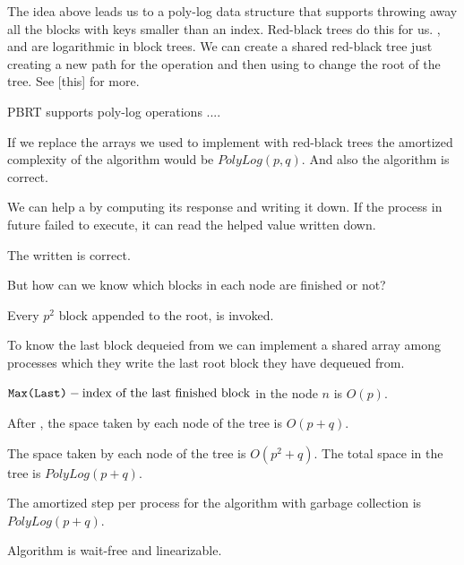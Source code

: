 The idea above leads us to a poly-log data structure that supports throwing away all the blocks with keys smaller than an index. Red-black trees do this for us. ,  and  are logarithmic in block trees.
We can create a shared red-black tree just creating a new path for the operation and then using  to change the root of the tree. See [this] for more.

\begin{observation}
PBRT supports poly-log operations ....
\end{observation}

\begin{lemma}
    If we replace the arrays we used to implement  with red-black trees the amortized complexity of the algorithm would be $PolyLog(p,q)$. And also the algorithm is correct.
\end{lemma}

We can help a  by computing its response and writing it down. If the process in future failed to execute, it can read the helped value written down.

\begin{lemma}
The  written is correct.
\end{lemma}

But how can we know which blocks in each node are finished or not? 

\begin{observation}
Every $p^2$ block appended to the root,  is invoked.  
\end{observation}

To know the last block dequeied from we can implement a shared array among processes which they write the last root block they have dequeued from. 

\begin{lemma}
    ${\normalfont{\texttt{Max(Last)}}} - \text{index of the last finished block}$ in the node $n$ is $O(p)$.
\end{lemma}

\begin{lemma}
    After , the space taken by each node of the tree is $O(p+q)$.
\end{lemma}

\begin{corollary}
The space taken by each node of the tree is $O(p^2+q)$. The total space in the tree is $PolyLog(p+q)$.
\end{corollary}

\begin{lemma}
  The amortized step per process for the algorithm with garbage collection is $PolyLog(p+q)$.
\end{lemma}

\begin{lemma}
  Algorithm is wait-free and linearizable.
\end{lemma}



